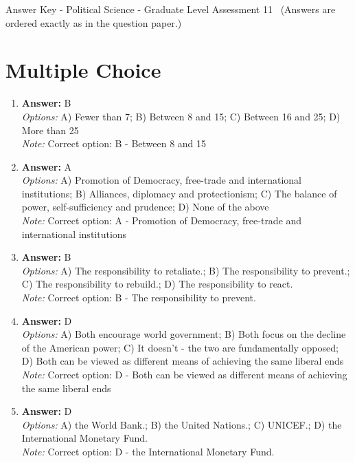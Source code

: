 \documentclass[12pt]{article}
\begin{document}
\begin{center}
Answer Key - Political Science - Graduate Level Assessment 11 \
\small (Answers are ordered exactly as in the question paper.)
\end{center}

\section*{Multiple Choice}
\begin{enumerate}[label=\arabic*.]
\item \textbf{Answer:} B
\\ \textit{Options:} A) Fewer than 7; B) Between 8 and 15; C) Between 16 and 25; D) More than 25
\\ \textit{Note:} Correct option: B - Between 8 and 15
\item \textbf{Answer:} A
\\ \textit{Options:} A) Promotion of Democracy, free-trade and international institutions; B) Alliances, diplomacy and protectionism; C) The balance of power, self-sufficiency and prudence; D) None of the above
\\ \textit{Note:} Correct option: A - Promotion of Democracy, free-trade and international institutions
\item \textbf{Answer:} B
\\ \textit{Options:} A) The responsibility to retaliate.; B) The responsibility to prevent.; C) The responsibility to rebuild.; D) The responsibility to react.
\\ \textit{Note:} Correct option: B - The responsibility to prevent.
\item \textbf{Answer:} D
\\ \textit{Options:} A) Both encourage world government; B) Both focus on the decline of the American power; C) It doesn't - the two are fundamentally opposed; D) Both can be viewed as different means of achieving the same liberal ends
\\ \textit{Note:} Correct option: D - Both can be viewed as different means of achieving the same liberal ends
\item \textbf{Answer:} D
\\ \textit{Options:} A) the World Bank.; B) the United Nations.; C) UNICEF.; D) the International Monetary Fund.
\\ \textit{Note:} Correct option: D - the International Monetary Fund.
\end{enumerate}
\end{document}
